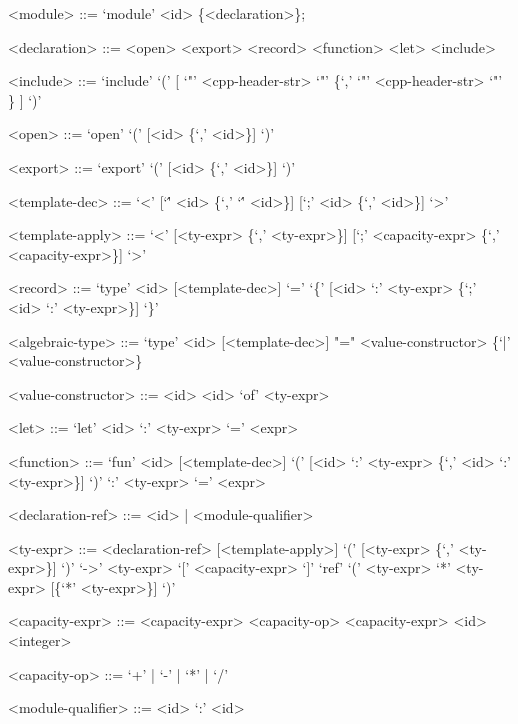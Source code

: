 \documentclass{sigplanconf}
\begin{document}
\begin{grammar}

<module>            ::= `module' <id> \{<declaration>\};

<declaration>       ::= <open>
                     \alt  <export>
                     \alt  <record>
                     \alt  <function>
                     \alt  <let>
                     \alt  <include>

<include>           ::= `include' `(' [ `"' <cpp-header-str> `"' \{`,' `"' <cpp-header-str> `"' \} ] `)'

<open>              ::= `open' `(' [<id> \{`,' <id>\}] `)'

<export>            ::= `export' `(' [<id> \{`,' <id>\}] `)'

<template-dec>      ::= `<' [`\'' <id> \{`,' `\'' <id>\}] [`;' <id> \{`,' <id>\}] `>'

<template-apply>    ::= `<' [<ty-expr> \{`,' <ty-expr>\}] [`;' <capacity-expr> \{`,' <capacity-expr>\}] `>'

<record>            ::= `type' <id> [<template-dec>] `=' `\{' [<id> `:' <ty-expr> \{`;' <id> `:' <ty-expr>\}] `\}'

<algebraic-type>    ::= `type' <id> [<template-dec>] "=" <value-constructor> \{`|' <value-constructor>\}

<value-constructor> ::= <id>
                     \alt   <id> `of' <ty-expr>

<let>               ::= `let' <id> `:' <ty-expr> `=' <expr>

<function>          ::= `fun' <id> [<template-dec>] `(' [<id> `:' <ty-expr> \{`,' <id> `:' <ty-expr>\}] `)' `:' <ty-expr> `=' <expr>

<declaration-ref>   ::= <id> | <module-qualifier>

<ty-expr>           ::= <declaration-ref> [<template-apply>]
                     \alt  `(' [<ty-expr> \{`,' <ty-expr>\}] `)' `->' <ty-expr>
                      `[' <capacity-expr> `]'
                      `ref'
                     \alt  `(' <ty-expr> `*' <ty-expr> [\{`*' <ty-expr>\}] `)'

<capacity-expr>     ::= <capacity-expr> <capacity-op> <capacity-expr>
                     \alt  <id>
                     \alt  <integer>

<capacity-op>       ::= `+' | `-' | `*' | `/'

<module-qualifier>  ::= <id> `:' <id>


\end{grammar}
\end{document}
